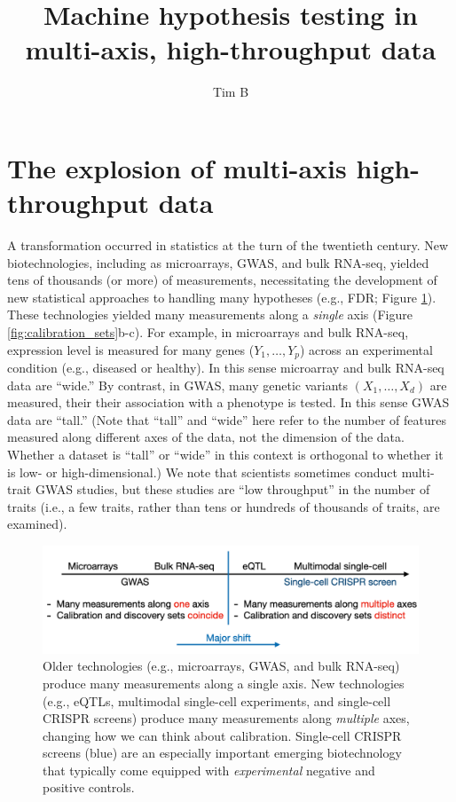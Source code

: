\documentclass[12pt]{article}
\title{Machine hypothesis testing in multi-axis, high-throughput data}
\author{Tim B}
\begin{document}
\maketitle
\section{The explosion of multi-axis high-throughput data}

A transformation occurred in statistics at the turn of the twentieth century. New biotechnologies, including as microarrays, GWAS, and bulk RNA-seq, yielded tens of thousands (or more) of measurements, necessitating the development of new statistical approaches to handling many hypotheses (e.g., FDR; Figure \ref{fig:technologies}). These technologies yielded many measurements along a \textit{single} axis (Figure \ref{fig:calibration_sets}b-c). For example, in microarrays and bulk RNA-seq, expression level is measured for many genes ($Y_1, \dots, Y_p$) across an experimental condition (e.g., diseased or healthy). In this sense microarray and bulk RNA-seq data are ``wide.'' By contrast, in GWAS, many genetic variants $(X_1, \dots, X_d)$ are measured, their their association with a phenotype is tested. In this sense GWAS data are ``tall.'' (Note that ``tall'' and ``wide'' here refer to the number of features measured along different axes of the data, not the dimension of the data. Whether a dataset is ``tall'' or ``wide'' in this context is orthogonal to whether it is low- or high-dimensional.) We note that scientists sometimes conduct multi-trait GWAS studies, but these studies are ``low throughput'' in the number of traits (i.e., a few traits, rather than tens or hundreds of thousands of traits, are examined). 

\begin{figure}[h!]
	\centering
	\includegraphics[width=1\linewidth]{technologies}
	\caption{Older technologies (e.g., microarrays, GWAS, and bulk RNA-seq) produce many measurements along a single axis. New technologies (e.g., eQTLs, multimodal single-cell experiments, and single-cell CRISPR screens) produce many measurements along \textit{multiple} axes, changing how we can think about calibration. Single-cell CRISPR screens (blue) are an especially important emerging biotechnology that typically come equipped with \textit{experimental} negative and positive controls.}
	\label{fig:technologies}
\end{figure}
\end{document}
